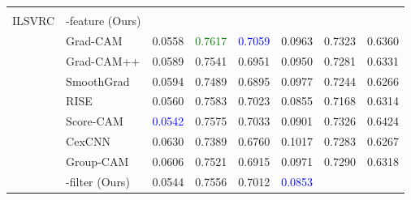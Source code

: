 \begin{table*}[ht]
{\begin{tabular}{p{2cm}<{\centering}| p{3.5cm}<{\centering}| p{1.8cm}<{\centering} p{1.8cm}<{\centering} p{1.8cm}<{\centering}| p{1.8cm}<{\centering} p{1.8cm}<{\centering} p{1.8cm}<{\centering}}
  \cellcolor[HTML]{EFEFEF}{\textcolor{blue}{0.6389}} &
  \cellcolor[HTML]{EFEFEF}{\textcolor{blue}{0.5370}} &
  \cellcolor[HTML]{EFEFEF}{\textcolor{blue}{0.1258}}  &
  \cellcolor[HTML]{EFEFEF}{\textcolor{blue}{0.6570}}  &
  \cellcolor[HTML]{EFEFEF}{\textcolor{blue}{0.5312}} \\
\multirow{-9}{*}{ILSVRC} &
  \cellcolor[HTML]{EFEFEF}\name{}-feature (Ours) &
  \cellcolor[HTML]{EFEFEF}{\textcolor{Green}{0.1005}} &
  \cellcolor[HTML]{EFEFEF}{\textcolor{Green}{0.6468}} &
  \cellcolor[HTML]{EFEFEF}{\textcolor{Green}{0.5462}} &
  \cellcolor[HTML]{EFEFEF}{\textcolor{Green}{0.1215}} &
  \cellcolor[HTML]{EFEFEF}{\textcolor{Green}{0.6603}} &
  \cellcolor[HTML]{EFEFEF}{\textcolor{Green}{0.5388}} \\ \hline
                          & Grad-CAM\cite{selvaraju2017grad}                 &  0.0558        &  \textcolor{Green}{0.7617}         &  \textcolor{blue}{0.7059}       & 0.0963         & 0.7323          & 0.6360           \\
                          & Grad-CAM++\cite{chattopadhay2018grad}               &  0.0589        & 0.7541           & 0.6951        & 0.0950         &  0.7281          & 0.6331          \\
                          & SmoothGrad \cite{smilkov2017smoothgrad}              & 0.0594         & 0.7489          & 0.6895         & 0.0977         & 0.7244          & 0.6266          \\
                          & RISE \cite{petsiuk2018rise}              &0.0560          & 0.7583          &  0.7023       & 0.0855         & 0.7168          & 0.6314         \\
                          & Score-CAM\cite{wang2019score}               &  \textcolor{blue}{0.0542}        & 0.7575          &   0.7033      &0.0901          & 0.7326          &  0.6424          \\
                        & CexCNN \cite{debbi2021causal}              & 0.0630         & 0.7389          & 0.6760        & 0.1017         & 0.7283          &  0.6267          \\
                          & Group-CAM \cite{zhang2021group}              & 0.0606         & 0.7521          & 0.6915        & 0.0971         & 0.7290          & 0.6318         \\
 &
  \cellcolor[HTML]{EFEFEF}\name{}-filter (Ours) &
  \cellcolor[HTML]{EFEFEF} 0.0544&
  \cellcolor[HTML]{EFEFEF} 0.7556&
  \cellcolor[HTML]{EFEFEF} 0.7012&
  \cellcolor[HTML]{EFEFEF} {\textcolor{blue}{0.0853}}&

\end{tabular}}
\end{table*}
